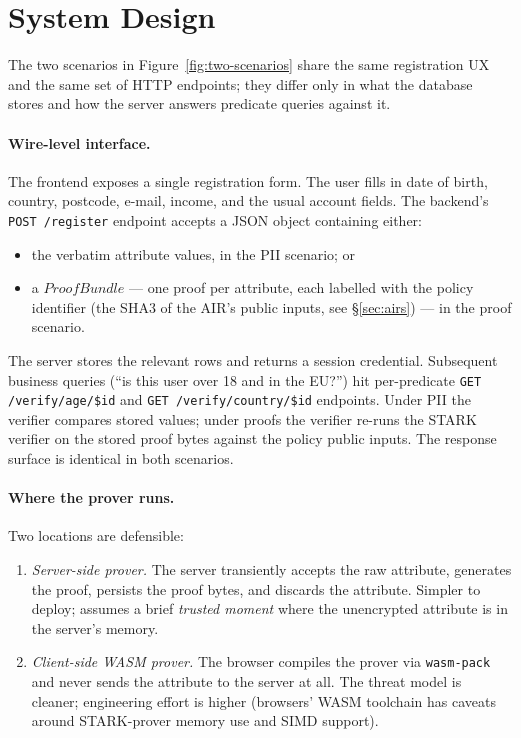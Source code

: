 \documentclass[11pt,a4paper]{article}
\begin{document}
\section{System Design}
\label{sec:design}

The two scenarios in Figure~\ref{fig:two-scenarios} share the same
registration UX and the same set of HTTP endpoints; they differ
only in what the database stores and how the server answers
predicate queries against it.

\paragraph{Wire-level interface.}  The frontend exposes a
single registration form.  The user fills in date of birth,
country, postcode, e\nobreakdash-mail, income, and the usual
account fields.  The backend's \texttt{POST /register} endpoint
accepts a JSON object containing either:

\begin{itemize}
  \item the verbatim attribute values, in the PII scenario; or
  \item a $\mathit{ProofBundle}$ — one proof per attribute, each
        labelled with the policy identifier (the SHA3 of the AIR's
        public inputs, see \S\ref{sec:airs}) — in the proof scenario.
\end{itemize}

The server stores the relevant rows and returns a session
credential.  Subsequent business queries (``is this user over 18
and in the EU?'') hit per\nobreakdash-predicate \texttt{GET
/verify/age/\$id} and \texttt{GET /verify/country/\$id} endpoints.
Under PII the verifier compares stored values; under proofs the
verifier re\nobreakdash-runs the STARK verifier on the stored proof
bytes against the policy public inputs.  The response surface is
identical in both scenarios.

\paragraph{Where the prover runs.}  Two locations are
defensible:

\begin{enumerate}
  \item \emph{Server\nobreakdash-side prover.}  The server transiently
        accepts the raw attribute, generates the proof, persists
        the proof bytes, and discards the attribute.  Simpler to
        deploy; assumes a brief \emph{trusted moment} where the
        unencrypted attribute is in the server's memory.
  \item \emph{Client\nobreakdash-side WASM prover.}  The browser
        compiles the prover via \texttt{wasm-pack} and never sends
        the attribute to the server at all.  The threat model is
        cleaner; engineering effort is higher (browsers' WASM
        toolchain has caveats around STARK\nobreakdash-prover memory
        use and SIMD support).
\end{enumerate}
\end{document}

